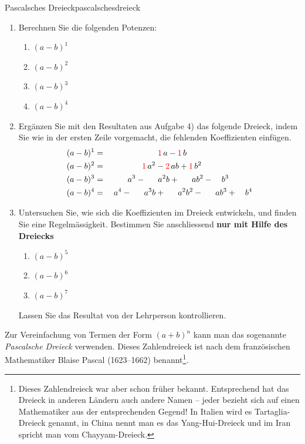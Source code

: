 \begin{LA}{Pascalsches Dreieck}{pascalschesdreieck}
\begin{enumerate}
              Lassen Sie das Resultat von der Lehrperson kontrollieren.

        \item Berechnen Sie die folgenden Potenzen:
              \begin{enumerate}
                  \item \((a-b)^1\)
                  \item \((a-b)^2\)
                  \item \((a-b)^3\)
                  \item \((a-b)^4\)
              \end{enumerate}

        \item Ergänzen Sie mit den Resultaten aus Aufgabe 4) das folgende Dreieck, indem Sie wie in der ersten Zeile vorgemacht, die fehlenden Koeffizienten einfügen.
              \[
                  \begin{aligned}
                      (a-b)^1 & = \phantom{a^4+4a^3+6a^2}{\color{red}1}\,a-{\color{red}1}\,b                              \\
                      (a-b)^2 & = \phantom{a^4+4a^3+}{\color{red}1}\,a^2-{\color{red}2}\,ab+{\color{red}1}\,b^2           \\
                      (a-b)^3 & = \phantom{a^4+4}a^3-\phantom{1}\quad a^2b+\phantom{1}\quad ab^2-\quad b^3                \\
                      (a-b)^4 & = \quad a^4-\phantom{1}\quad a^3b+\phantom{1}\quad a^2b^2-\phantom{1}\quad ab^3+\quad b^4
                  \end{aligned}
              \]

        \item Untersuchen Sie, wie sich die Koeffizienten im Dreieck entwickeln, und finden Sie eine Regelmässigkeit. Bestimmen Sie anschliessend \textbf{nur mit Hilfe des Dreiecks}
              \begin{enumerate}
                  \item \((a-b)^5\)
                  \item \((a-b)^6\)
                  \item \((a-b)^7\)
              \end{enumerate}

              Lassen Sie das Resultat von der Lehrperson kontrollieren.
    \end{enumerate}
\end{LA}

\clearpage
Zur Vereinfachung von Termen der Form \((a+b)^n\) kann man das sogenannte
\textit{Pascalsche Dreieck} verwenden. Dieses Zahlendreieck ist nach dem
französischen Mathematiker Blaise Pascal (1623--1662) benannt\footnote{
    Dieses Zahlendreieck war aber schon früher bekannt. Entsprechend hat das
    Dreieck in anderen Ländern auch andere Namen -- jeder bezieht sich auf einen
    Mathematiker aus der entsprechenden Gegend! In Italien wird es
    Tartaglia-Dreieck genannt, in China nennt man es das Yang-Hui-Dreieck und im
    Iran spricht man vom Chayyam-Dreieck.}.

